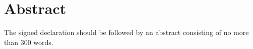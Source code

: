 \chapter{Abstract}

The signed declaration should be followed by an abstract consisting of no more than 300 words.








